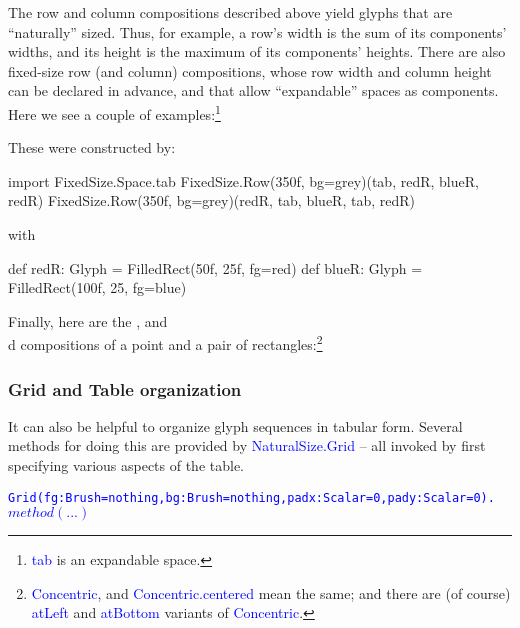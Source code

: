 \documentclass[12pt,a4paper]{article}
\def\Scala#1{\textcolor{blue}{\textsf{#1}}}
\def\SSS#1{\subsubsection*{#1}}
\begin{document}
The row and column compositions described above yield glyphs that
are ``naturally'' sized. Thus, for example, a row's width is the
sum of its components' widths, and its height is the maximum of its
components' heights. There are also fixed-size row (and column)
compositions, whose row width and column height can be declared in advance,
and that allow ``expandable'' spaces as components. Here we see a couple of examples:\footnote{\Scala{tab} is
an expandable space.}

\begin{center}
\quad\quad
{}
\end{center}

These were constructed by:
\begin{scala}
import FixedSize.Space.tab
FixedSize.Row(350f, bg=grey)(tab, redR, blueR, redR)
FixedSize.Row(350f, bg=grey)(redR, tab, blueR, tab, redR)
\end{scala}
with
\begin{scala}
def redR:  Glyph = FilledRect(50f, 25f, fg=red)
def blueR: Glyph = FilledRect(100f, 25, fg=blue)
\end{scala}

Finally, here are the ,
 and \\d{}
compositions of a point and a pair of rectangles:\footnote{\Scala{Concentric}, and
\Scala{Concentric.centered} mean the same;
and there are (of course) \Scala{atLeft} and \Scala{atBottom} variants
of \Scala{Concentric}.}


\begin{center}
\quad\quad
{}
\quad\quad
{} 
\end{center}



\clearpage
\SSS{Grid and Table organization}
It can also be helpful to organize glyph sequences in tabular
form. Several methods for doing
this are provided by \Scala{NaturalSize.Grid} --
all invoked by first specifying various aspects of the table.


\begin{alltt}\textcolor{blue}{Grid(fg: Brush=nothing, bg: Brush=nothing, padx: Scalar=0, pady: Scalar=0).\(method(...)\)}
\end{alltt}
\end{document}
